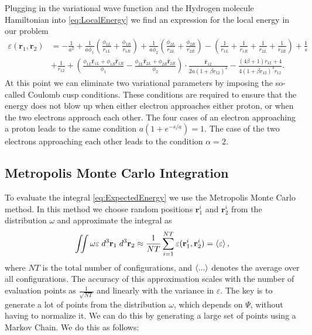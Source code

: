 \documentclass[twoside]{article}
\newcommand{\bfr}{\ensuremath{\mathbf{r}}}
\begin{document}
Plugging in the variational wave function and the Hydrogen molecule Hamiltonian into \eqref{eq:LocalEnergy} we find an expression for the local energy in our problem
\begin{equation}
\begin{split}
\varepsilon(\bfr_1,\bfr_2) &= 
-\frac{1}{a^2} 
+ \frac{1}{a\phi_1} \left(\frac{\phi_{1L}}{r_{1L}} + \frac{\phi_{1R}}{r_{1R}}\right) 
+ \frac{1}{a\phi_2} \left(\frac{\phi_{2L}}{r_{2L}} + \frac{\phi_{2R}}{r_{2R}}\right)
- \left( \frac{1}{r_{1L}}+\frac{1}{r_{1R}}+\frac{1}{r_{2L}}+\frac{1}{r_{2R}} \right) + \frac{1}{s} \\
&+ \frac{1}{r_{12}} 
+ \left( \frac{\phi_{1L}\hat{\bfr}_{1L} + \phi_{1R}\hat{\bfr}_{1R}}{\phi_1} - \frac{\phi_{2L}\hat{\bfr}_{2L} + \phi_{2R}\hat{\bfr}_{2R}}{\phi_2} \right) \cdot \frac{\hat{\bfr}_{12}}{2a(1+\beta r_{12})^2} 
- \frac{(4\beta+1)r_{12}+4}{4(1+\beta r_{12})^4 r_{12}}. 
\end{split}
\end{equation}
At this point we can eliminate two variational parameters by imposing the so-called Coulomb cusp conditions. These conditions are required to ensure that the energy does not blow up when either electron approaches either proton, or when the two electrons approach each other. The four cases of an electron approaching a proton leads to the same condition $a(1+e^{-s/a}) = 1$. The case of the two electrons approaching each other leads to the condition $\alpha = 2$.

\subsection{Metropolis Monte Carlo Integration}\label{sec:metropolis}
To evaluate the integral \eqref{eq:ExpectedEnergy} we use the Metropolis Monte Carlo method. In this method we choose random positions $\bfr_1^i$ and $\bfr_2^i$ from the distribution $\omega$ and approximate the integral as
\begin{equation}
\iint \omega \varepsilon \; d^3\bfr_1 \; d^3\bfr_2 \approx \frac{1}{NT} \sum_{i=1}^{NT} \varepsilon(\bfr_1^i,\bfr_2^i) = \braket{\varepsilon},
\end{equation}
where $NT$ is the total number of configurations, and $\braket{...}$ denotes the average over all configurations. The accuracy of this approximation scales with the number of evaluation points as $\frac{1}{\sqrt{NT}}$ and linearly with the variance in $\varepsilon$. The key is to generate a lot of points from the distribution $\omega$, which depends on $\Psi$, without having to normalize it. We can do this by generating a large set of points using a Markov Chain. We do this as follows:
\end{document}
